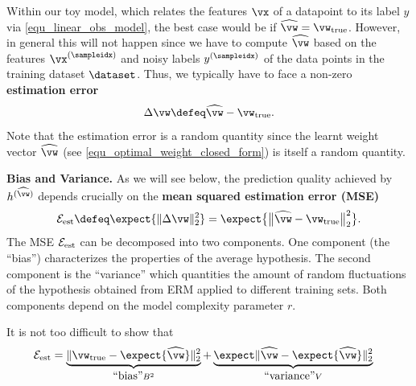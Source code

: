 \documentclass[12pt]{report}
\begin{document}
Within our toy model, which relates the features $\vx$ of a datapoint 
to its label $y$ via \eqref{equ_linear_obs_model}, the best case would 
be if $\widehat{\vw} = \vw_{\rm true}$. However, in general this will not 
happen since we have to compute $\widehat{\vw}$ based on the features 
$\vx^{(\sampleidx)}$ and noisy labels $y^{(\sampleidx)}$ of the data 
points in the training dataset $\dataset$. Thus, we typically have to 
face a non-zero {\bf estimation error}
\begin{equation}
\label{equ_def_est_error}
\Delta \vw \defeq \widehat{\vw} - \vw_{\rm true}. 
\end{equation} 
Note that the estimation error is a random quantity since the 
learnt weight vector $\widehat{\vw}$ (see \eqref{equ_optimal_weight_closed_form}) 
is itself a random quantity.

{\bf Bias and Variance.} 
As we will see below, the prediction quality achieved by $h^{(\widehat{\vw})}$ depends crucially on the 
{\bf mean squared estimation error (MSE)}
\begin{equation}
\label{equ_def_est_err}
\mathcal{E}_{\rm est} \defeq \expect \{  \| \Delta \vw \|^{2}_{2} \} =  \expect \big\{ \big \| \widehat{\vw} - \vw_{\rm true} \big\|^{2}_{2} \big \}. 
\end{equation}
The MSE $\mathcal{E}_{\rm est}$ can be decomposed into two components. 
One component (the ``bias'') characterizes the properties of the average 
hypothesis. The second component is the ``variance'' which quantities 
the amount of random fluctuations of the hypothesis obtained from ERM 
applied to different training sets. Both components depend on the model 
complexity parameter $r$. 

It is not too difficult to show that 
\vspace*{-1mm}
\begin{align}
\label{equ_bias_var_decomp}
\mathcal{E}_{\rm est} & = \underbrace{ \| \vw_{\rm true} - \expect \{ \widehat{\vw} \} \|^{2}_{2} }_{\mbox{``bias''} B^2}+ \underbrace{\expect \| \widehat{\vw} - \expect \{ \widehat{\vw} \} \|^{2}_{2}}_{\mbox{``variance''} V} 
\end{align} 
\end{document}
